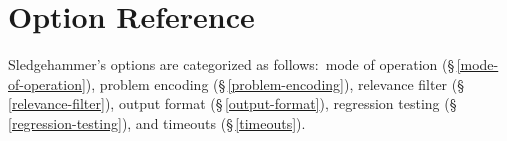 \documentclass[a4paper,12pt]{article}
\let\oldS=\S
\def\S{\oldS\,}
\def\qtybf#1{$\mathbf{\left<\textbf{\textit{#1\/}}\right>}$}
\renewcommand\_{\hbox{\textunderscore\kern-.05ex}}
\begin{document}
\section{Option Reference}
\label{option-reference}

\def\defl{\{}
\def\defr{\}}

\def\flushitem#1{\item[]\noindent\kern-\leftmargin \textbf{#1}}
\def\optrueonly#1{\flushitem{\textit{#1} $\bigl[$= \textit{true}$\bigr]$\enskip}\nopagebreak\\[\parskip]}
\def\optrue#1#2{\flushitem{\textit{#1} $\bigl[$= \qtybf{bool}$\bigr]$\enskip \defl\textit{true}\defr\hfill (neg.: \textit{#2})}\nopagebreak\\[\parskip]}
\def\opfalse#1#2{\flushitem{\textit{#1} $\bigl[$= \qtybf{bool}$\bigr]$\enskip \defl\textit{false}\defr\hfill (neg.: \textit{#2})}\nopagebreak\\[\parskip]}
\def\opsmart#1#2{\flushitem{\textit{#1} $\bigl[$= \qtybf{smart\_bool}$\bigr]$\enskip \defl\textit{smart}\defr\hfill (neg.: \textit{#2})}\nopagebreak\\[\parskip]}
\def\opsmartx#1#2{\flushitem{\textit{#1} $\bigl[$= \qtybf{smart\_bool}$\bigr]$\enskip \defl\textit{smart}\defr\\\hbox{}\hfill (neg.: \textit{#2})}\nopagebreak\\[\parskip]}
\def\opsmartfalse#1#2{\flushitem{\textit{#1} $\bigl[$= \qtybf{smart\_bool}$\bigr]$\enskip \defl\textit{false}\defr\hfill (neg.: \textit{#2})}\nopagebreak\\[\parskip]}
\def\opnodefault#1#2{\flushitem{\textit{#1} = \qtybf{#2}} \nopagebreak\\[\parskip]}
\def\opnodefaultbrk#1#2{\flushitem{$\bigl[$\textit{#1} =$\bigr]$ \qtybf{#2}} \nopagebreak\\[\parskip]}
\def\opdefault#1#2#3{\flushitem{\textit{#1} = \qtybf{#2}\enskip \defl\textit{#3}\defr} \nopagebreak\\[\parskip]}
\def\oparg#1#2#3{\flushitem{\textit{#1} \qtybf{#2} = \qtybf{#3}} \nopagebreak\\[\parskip]}
\def\opargbool#1#2#3{\flushitem{\textit{#1} \qtybf{#2} $\bigl[$= \qtybf{bool}$\bigr]$\hfill (neg.: \textit{#3})}\nopagebreak\\[\parskip]}
\def\opargboolorsmart#1#2#3{\flushitem{\textit{#1} \qtybf{#2} $\bigl[$= \qtybf{smart\_bool}$\bigr]$\hfill (neg.: \textit{#3})}\nopagebreak\\[\parskip]}

Sledgehammer's options are categorized as follows:\ mode of operation
(\S\ref{mode-of-operation}), problem encoding (\S\ref{problem-encoding}),
relevance filter (\S\ref{relevance-filter}), output format
(\S\ref{output-format}), regression testing (\S\ref{regression-testing}),
and timeouts (\S\ref{timeouts}).
\end{document}

